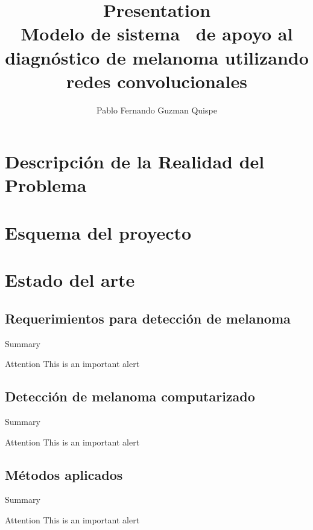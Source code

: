 \documentclass{beamer}
\title[Modelo de sistema  de apoyo al diagnóstico de melanoma utilizando redes convolucionales]{Presentation\\ Modelo de sistema  de apoyo al diagnóstico de melanoma utilizando redes convolucionales}
\author[A. Author]{Pablo Fernando Guzman Quispe}
\begin{document}
	\typesetFrontSlides


\section{Descripción de la Realidad del Problema}
\section{Esquema del proyecto}


\section{Estado del arte}


\subsection{Requerimientos para detección de melanoma}

\begin{frame}{Summary}
   	\begin{alertblock}{Attention}
   		\textlatin{This is an important alert}
   	\end{alertblock}
\end{frame}

\subsection{Detección de melanoma computarizado }

\begin{frame}{Summary}
\begin{alertblock}{Attention}
	\textlatin{This is an important alert}
\end{alertblock}
\end{frame}

\subsection{Métodos aplicados }

\begin{frame}{Summary}
\begin{alertblock}{Attention}
	\textlatin{This is an important alert}
\end{alertblock}
\end{frame}
\end{document}
